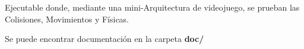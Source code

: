 Ejecutable donde, mediante una mini-\/\-Arquitectura de videojuego, se prueban las Colisiones, Movimientos y Físicas.

Se puede encontrar documentación en la carpeta {\bfseries doc/} 
